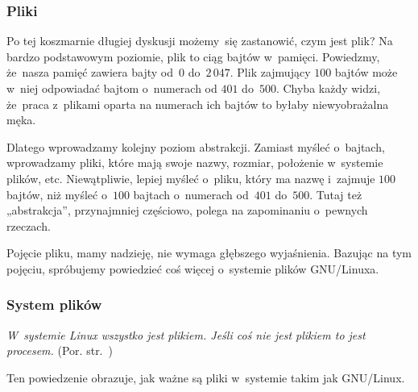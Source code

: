 \documentclass[10pt,t]{beamer}
\begin{document}
\begin{frame}
  \frametitle{Pliki}


  Po tej koszmarnie długiej dyskusji możemy~się zastanowić, czym jest plik?
  Na bardzo podstawowym poziomie, plik to ciąg bajtów w~pamięci. Powiedzmy,
  że~nasza pamięć zawiera bajty od~$0$ do~$2 \, 047$. Plik zajmujący
  $100$ bajtów może w~niej odpowiadać bajtom o~numerach od $401$ do~$500$.
  Chyba każdy widzi, że~praca z~plikami oparta na numerach ich bajtów to
  byłaby niewyobrażalna męka.

  Dlatego wprowadzamy kolejny poziom abstrakcji. Zamiast myśleć o~bajtach,
  wprowadzamy pliki, które mają swoje nazwy, rozmiar, położenie w~systemie
  plików, etc. Niewątpliwie, lepiej myśleć o~pliku, który ma nazwę i~zajmuje
  $100$ bajtów, niż myśleć o~$100$ bajtach o~numerach od~$401$ do~$500$.
  Tutaj też „abstrakcja”, przynajmniej częściowo, polega na zapominaniu
  o~pewnych rzeczach.

  Pojęcie pliku, mamy nadzieję, nie wymaga głębszego wyjaśnienia. Bazując
  na tym pojęciu, spróbujemy powiedzieć coś więcej o~systemie plików
  GNU/Linuxa.

\end{frame}





\begin{frame}
  \frametitle{System plików}


  \textit{W~systemie Linux wszystko jest plikiem. Jeśli coś nie jest
    plikiem to jest procesem.} (Por.
  str.~\parencite{Garrels-Introduction-to-Linux-A-Hands-on-Guide-Ver-2008})

  Ten powiedzenie obrazuje, jak ważne są pliki w~systemie takim jak
  GNU/Linux.

\end{frame}
\end{document}
